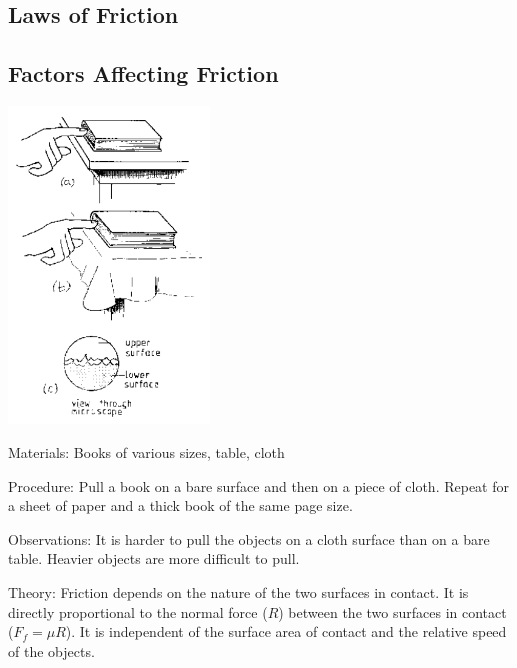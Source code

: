 \begin{multicols}{2}

\section*{Laws of Friction}


\subsection{Factors Affecting Friction}

\begin{center}
\includegraphics[width=0.4\textwidth]{./img/source/friction-factors.png}
\end{center}

\begin{description*}
\item[Materials:]{Books of various sizes, table, cloth}
\item[Procedure:]{Pull a book on a bare surface and then on a piece of cloth. Repeat for a sheet of paper and a thick book of the same page size.}
\item[Observations:]{It is harder to pull the objects on a cloth surface than on a bare table. Heavier objects are more difficult to pull.}
\item[Theory:]{Friction depends on the nature of the two surfaces in contact. It is directly proportional to the normal force ($R$) between the two surfaces in contact ($F_f=\mu R$). It is independent of the surface area of contact and the relative speed of the objects.}
\end{description*}


\end{multicols}
